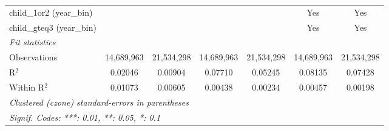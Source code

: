 \begin{tabular}{lcccccc}
child\_1or2 (year\_bin) &  &  &  &  & Yes & Yes\\
child\_gteq3 (year\_bin) &  &  &  &  & Yes & Yes\\
\midrule \emph{Fit statistics}&  & & & & & \\
Observations & 14,689,963&21,534,298&14,689,963&21,534,298&14,689,963&21,534,298\\
R$^2$ & 0.02046&0.00904&0.07710&0.05245&0.08135&0.07428\\
Within R$^2$ & 0.01073&0.00605&0.00438&0.00234&0.00457&0.00198\\
\midrule\midrule\multicolumn{7}{l}{\emph{Clustered (czone) standard-errors in parentheses}}\\
\multicolumn{7}{l}{\emph{Signif. Codes: ***: 0.01, **: 0.05, *: 0.1}}\\
\end{tabular}


